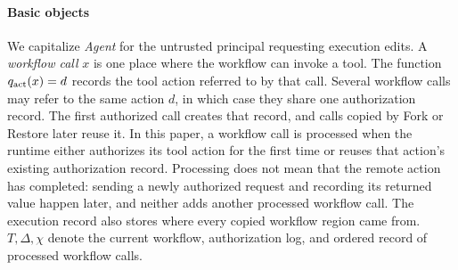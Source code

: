 \paragraph{Basic objects}
We capitalize \emph{Agent} for the untrusted principal requesting execution edits.
A \emph{workflow call} \(x\) is one place where the workflow can invoke a tool.
The function \(q_{\rm act}(x)=d\) records the tool action referred to by that call.
Several workflow calls may refer to the same action \(d\), in which case they share one authorization record.
The first authorized call creates that record, and calls copied by Fork or Restore later reuse it.
In this paper, a workflow call is processed when the runtime either authorizes its tool action for the first time or reuses that action's existing authorization record.
Processing does not mean that the remote action has completed: sending a newly authorized request and recording its returned value happen later, and neither adds another processed workflow call.
The execution record also stores where every copied workflow region came from.
\(T,\Delta,\chi\) denote the current workflow, authorization log, and ordered record of processed workflow calls.

